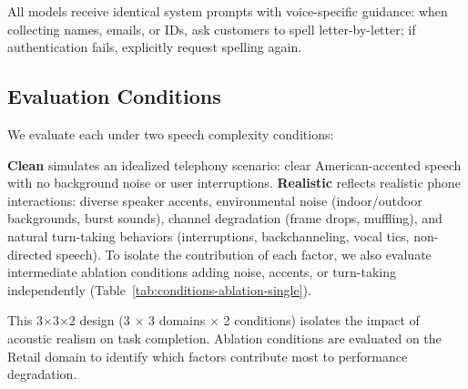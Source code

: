 \begin{table}[h]
\caption{Audio-native models evaluated.}
\label{tab:models}
\centering
\begin{small}
\end{small}
\end{table}

All models receive identical system prompts with voice-specific guidance: when collecting names, emails, or IDs, ask customers to spell letter-by-letter; if authentication fails, explicitly request spelling again.

\subsection{Evaluation Conditions}

We evaluate each  under two speech complexity conditions:



\textbf{Clean} simulates an idealized telephony scenario: clear American-accented speech with no background noise or user interruptions. \textbf{Realistic} reflects realistic phone interactions: diverse speaker accents, environmental noise (indoor/outdoor backgrounds, burst sounds), channel degradation (frame drops, muffling), and natural turn-taking behaviors (interruptions, backchanneling, vocal tics, non-directed speech). To isolate the contribution of each factor, we also evaluate intermediate ablation conditions adding noise, accents, or turn-taking independently (Table~\ref{tab:conditions-ablation-single}).



This 3$\times$3$\times$2 design (3  $\times$ 3 domains $\times$ 2 conditions) isolates the impact of acoustic realism on task completion. Ablation conditions are evaluated on the Retail domain to identify which factors contribute most to performance degradation.

